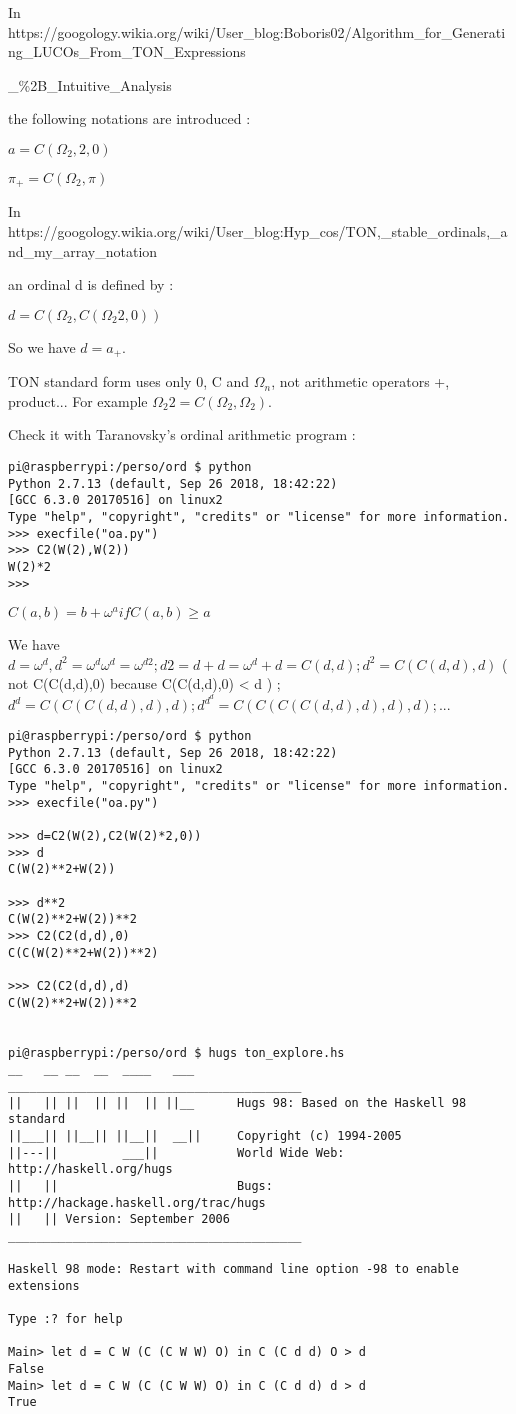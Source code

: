 \documentclass[10pt]{article}
\begin{document}
In https://googology.wikia.org/wiki/User\_blog:Boboris02/Algorithm\_for\_Generating\_LUCOs\_From\_TON\_Expressions

\_\%2B\_Intuitive\_Analysis 

the following notations are introduced :

 $a = C(\Omega_2,2,0)$
 
 $\pi_+ = C(\Omega_2,\pi)$
 
In https://googology.wikia.org/wiki/User\_blog:Hyp\_cos/TON,\_stable\_ordinals,\_and\_my\_array\_notation 

an ordinal d is defined by :

 $d = C(\Omega_2,C(\Omega_2 2, 0))$
 
So we have $d = a_+$.

TON standard form uses only 0, C and $\Omega_n$, not arithmetic operators +, product...
For example $\Omega_2 2 = C(\Omega_2,\Omega_2)$.

Check it with Taranovsky's ordinal arithmetic program :

\begin{verbatim}
pi@raspberrypi:/perso/ord $ python
Python 2.7.13 (default, Sep 26 2018, 18:42:22)
[GCC 6.3.0 20170516] on linux2
Type "help", "copyright", "credits" or "license" for more information.
>>> execfile("oa.py")
>>> C2(W(2),W(2))
W(2)*2
>>>
\end{verbatim}

$C(a,b) = b+\omega^a if C(a,b) \ge a$

We have $d = \omega^d, d^2 = \omega^d \omega^d = \omega^{d 2} ; d 2 = d + d = \omega^d + d = C(d,d) ; d^2 = C(C(d,d),d)$ ( not C(C(d,d),0) because C(C(d,d),0) < d ) ; $d^d = C(C(C(d,d),d),d) ; d^{d^d} = C(C(C(C(d,d),d),d),d) ; ... $

\begin{verbatim}
pi@raspberrypi:/perso/ord $ python
Python 2.7.13 (default, Sep 26 2018, 18:42:22)
[GCC 6.3.0 20170516] on linux2
Type "help", "copyright", "credits" or "license" for more information.
>>> execfile("oa.py")

>>> d=C2(W(2),C2(W(2)*2,0))
>>> d
C(W(2)**2+W(2))

>>> d**2
C(W(2)**2+W(2))**2
>>> C2(C2(d,d),0)
C(C(W(2)**2+W(2))**2)

>>> C2(C2(d,d),d)
C(W(2)**2+W(2))**2


pi@raspberrypi:/perso/ord $ hugs ton_explore.hs
__   __ __  __  ____   ___      _________________________________________
||   || ||  || ||  || ||__      Hugs 98: Based on the Haskell 98 standard
||___|| ||__|| ||__||  __||     Copyright (c) 1994-2005
||---||         ___||           World Wide Web: http://haskell.org/hugs
||   ||                         Bugs: http://hackage.haskell.org/trac/hugs
||   || Version: September 2006 _________________________________________

Haskell 98 mode: Restart with command line option -98 to enable extensions

Type :? for help

Main> let d = C W (C (C W W) O) in C (C d d) O > d
False
Main> let d = C W (C (C W W) O) in C (C d d) d > d
True
\end{verbatim}
\end{document}
